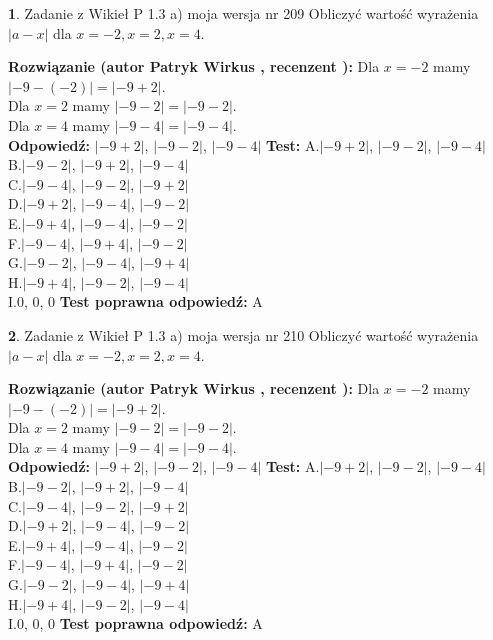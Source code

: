 \documentclass[12pt, a4paper]{article}
\theoremstyle{definition} %
\newtheorem{zad}{}
\newcommand{\zadStart}[1]{\begin{zad}#1\newline}
\newcommand{\zadStop}{\end{zad}}
\newcommand{\rozwStart}[2]{\noindent \textbf{Rozwiązanie (autor #1 , recenzent #2): }\newline}
\newcommand{\rozwStop}{\newline}
\newcommand{\odpStart}{\noindent \textbf{Odpowiedź:}\newline}
\newcommand{\odpStop}{\newline}
\newcommand{\testStart}{\noindent \textbf{Test:}\newline}
\newcommand{\testStop}{\newline}
\newcommand{\kluczStart}{\noindent \textbf{Test poprawna odpowiedź:}\newline}
\newcommand{\kluczStop}{\newline}
\begin{document}
\zadStart{Zadanie z Wikieł P 1.3 a) moja wersja nr 209}
Obliczyć wartość wyrażenia $|a - x|$ dla $x=-2,x=2,x=4$.
\zadStop
\rozwStart{Patryk Wirkus}{}
Dla $x = -2$ mamy $|-9 - (-2)| = |-9 + 2|$.\\
Dla $x = 2$ mamy $|-9 - 2| = |-9 - 2|$.\\
Dla $x = 4$ mamy $|-9 - 4| = |-9 - 4|$.\\
\rozwStop
\odpStart
$|-9 + 2|$, $|-9 - 2|$, $|-9 - 4|$
\odpStop
\testStart
A.$|-9 + 2|$, $|-9 - 2|$, $|-9 - 4|$\\
B.$|-9 - 2|$, $|-9 + 2|$, $|-9 - 4|$\\
C.$|-9 - 4|$, $|-9 - 2|$, $|-9 + 2|$\\
D.$|-9 + 2|$, $|-9 - 4|$, $|-9 - 2|$\\
E.$|-9 + 4|$, $|-9 - 4|$, $|-9 - 2|$\\
F.$|-9 - 4|$, $|-9 + 4|$, $|-9 - 2|$\\
G.$|-9 - 2|$, $|-9 - 4|$, $|-9 + 4|$\\
H.$|-9 + 4|$, $|-9 - 2|$, $|-9 - 4|$\\
I.$0$, $0$, $0$
\testStop
\kluczStart
A
\kluczStop



\zadStart{Zadanie z Wikieł P 1.3 a) moja wersja nr 210}
Obliczyć wartość wyrażenia $|a - x|$ dla $x=-2,x=2,x=4$.
\zadStop
\rozwStart{Patryk Wirkus}{}
Dla $x = -2$ mamy $|-9 - (-2)| = |-9 + 2|$.\\
Dla $x = 2$ mamy $|-9 - 2| = |-9 - 2|$.\\
Dla $x = 4$ mamy $|-9 - 4| = |-9 - 4|$.\\
\rozwStop
\odpStart
$|-9 + 2|$, $|-9 - 2|$, $|-9 - 4|$
\odpStop
\testStart
A.$|-9 + 2|$, $|-9 - 2|$, $|-9 - 4|$\\
B.$|-9 - 2|$, $|-9 + 2|$, $|-9 - 4|$\\
C.$|-9 - 4|$, $|-9 - 2|$, $|-9 + 2|$\\
D.$|-9 + 2|$, $|-9 - 4|$, $|-9 - 2|$\\
E.$|-9 + 4|$, $|-9 - 4|$, $|-9 - 2|$\\
F.$|-9 - 4|$, $|-9 + 4|$, $|-9 - 2|$\\
G.$|-9 - 2|$, $|-9 - 4|$, $|-9 + 4|$\\
H.$|-9 + 4|$, $|-9 - 2|$, $|-9 - 4|$\\
I.$0$, $0$, $0$
\testStop
\kluczStart
A
\kluczStop
\end{document}
